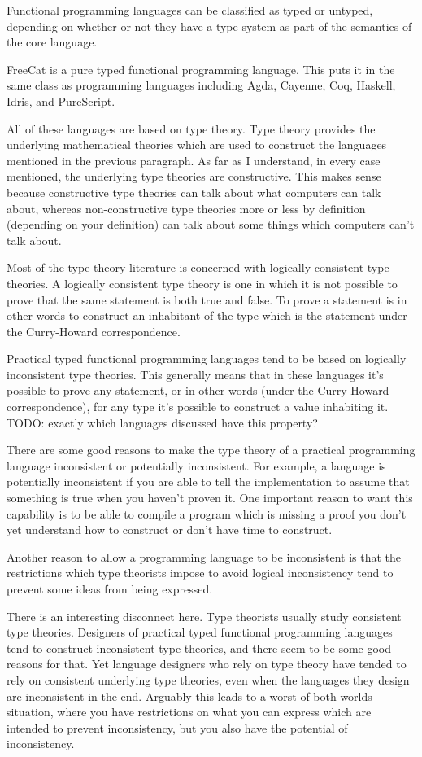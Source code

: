 \documentclass{article}
\begin{document}
Functional programming languages can be classified as typed or untyped, depending on whether or not they have a type system as part of the semantics of the core language.

FreeCat is a pure typed functional programming language. This puts it in the same class as programming languages including Agda, Cayenne, Coq, Haskell, Idris, and PureScript.

All of these languages are based on type theory. Type theory provides the underlying mathematical theories which are used to construct the languages mentioned in the previous paragraph. As far as I understand, in every case mentioned, the underlying type theories are constructive. This makes sense because constructive type theories can talk about what computers can talk about, whereas non-constructive type theories more or less by definition (depending on your definition) can talk about some things which computers can't talk about.

Most of the type theory literature is concerned with logically consistent type theories. A logically consistent type theory is one in which it is not possible to prove that the same statement is both true and false. To prove a statement is in other words to construct an inhabitant of the type which is the statement under the Curry-Howard correspondence.

Practical typed functional programming languages tend to be based on logically inconsistent type theories. This generally means that in these languages it's possible to prove any statement, or in other words (under the Curry-Howard correspondence), for any type it's possible to construct a value inhabiting it. TODO: exactly which languages discussed have this property?

There are some good reasons to make the type theory of a practical programming language inconsistent or potentially inconsistent. For example, a language is potentially inconsistent if you are able to tell the implementation to assume that something is true when you haven't proven it. One important reason to want this capability is to be able to compile a program which is missing a proof you don't yet understand how to construct or don't have time to construct.

Another reason to allow a programming language to be inconsistent is that the restrictions which type theorists impose to avoid logical inconsistency tend to prevent some ideas from being expressed.

There is an interesting disconnect here. Type theorists usually study consistent type theories. Designers of practical typed functional programming languages tend to construct inconsistent type theories, and there seem to be some good reasons for that. Yet language designers who rely on type theory have tended to rely on consistent underlying type theories, even when the languages they design are inconsistent in the end. Arguably this leads to a worst of both worlds situation, where you have restrictions on what you can express which are intended to prevent inconsistency, but you also have the potential of inconsistency.
\end{document}
